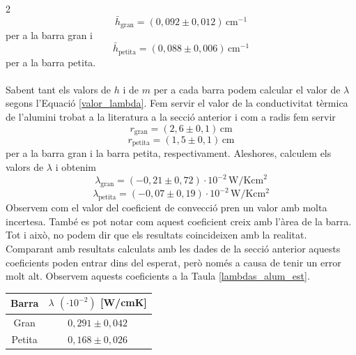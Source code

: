 \documentclass[12pt,twosides,onecolumn,openany]{article}
\newenvironment{Figura}
  {\par\medskip\noindent\minipage{\linewidth}}
  {\endminipage\par\medskip}
\begin{document}
\begin{multicols}{2}
\begin{equation*}
  \bar{h}_{\text{gran}} = (0,092\pm0,012) \, \text{cm}^{-1}
\end{equation*}
per a la barra gran i
\begin{equation*}
  \bar{h}_{\text{petita}} = (0,088\pm0,006) \, \text{cm}^{-1}
\end{equation*}
per a la barra petita.\\\\
Sabent tant els valors de $h$ i de $m$ per a cada barra podem calcular el valor de $\lambda$ segons l'Equació \ref{valor_lambda}. Fem servir el valor de la conductivitat tèrmica de l'alumini trobat a la literatura a la secció anterior i com a radis fem servir
\begin{equation*}
  r_{\text{gran}} = (2,6\pm0,1)\, \text{cm}
\end{equation*}
\begin{equation*}
  r_{\text{petita}} = (1,5\pm0,1)\, \text{cm}
\end{equation*}
per a la barra gran i la barra petita, respectivament. Aleshores, calculem els valors de $\lambda$ i obtenim
\begin{equation*}
  \lambda_{\text{gran}} = (-0,21\pm0,72)\cdot 10^{-2} \, \text{W}/\text{Kcm}^{2}
\end{equation*}
\begin{equation*}
  \lambda_{\text{petita}} = (-0,07\pm0,19)\cdot 10^{-2} \, \text{W}/\text{K}\text{cm}^{2}
\end{equation*}
Observem com el valor del coeficient de convecció pren un valor amb molta incertesa. També es pot notar com aquest coeficient creix amb l'àrea de la barra. Tot i això, no podem dir que els resultats coincideixen amb la realitat. Comparant amb resultats calculats amb les dades de la secció anterior aquests coeficients poden entrar dins del esperat, però només a causa de tenir un error molt alt. Observem aquests coeficients a la Taula \ref{lambdas_alum_est}.
\begin{Figura}
  \centering
  \begin{tabular}{c|c}
    Barra & $\lambda$ $(\cdot 10^{-2})$ [W/cmK]\\ \hline \hline
    Gran & $0,291\pm0,042$\\
    Petita & $0,168\pm0,026$ 
  \end{tabular}
  \label{lambdas_alum_est}
\end{Figura}

\end{multicols}
\end{document}
